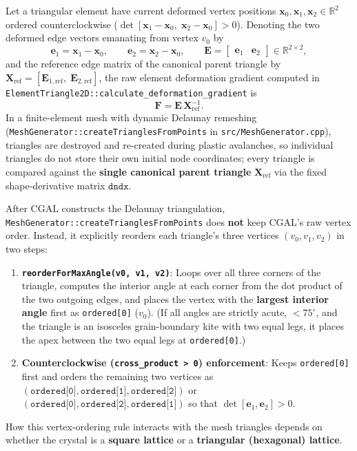 \documentclass[11pt,a4paper]{article}
\newcommand{\R}{\mathbb{R}}
\newcommand{\code}[1]{\texttt{#1}}
\begin{document}
Let a triangular element have current deformed vertex positions $\mathbf{x}_0, \mathbf{x}_1, \mathbf{x}_2 \in \R^2$ ordered counterclockwise ($\det[\mathbf{x}_1-\mathbf{x}_0,\;\mathbf{x}_2-\mathbf{x}_0] > 0$). Denoting the two deformed edge vectors emanating from vertex $v_0$ by
\begin{equation}
  \mathbf{e}_1 = \mathbf{x}_1 - \mathbf{x}_0, \qquad
  \mathbf{e}_2 = \mathbf{x}_2 - \mathbf{x}_0, \qquad
  \mathbf{E} = \begin{bmatrix} \mathbf{e}_1 & \mathbf{e}_2 \end{bmatrix} \in \R^{2\times 2},
\end{equation}
and the reference edge matrix of the canonical parent triangle by $\mathbf{X}_{\text{ref}} = [\mathbf{E}_{1,\text{ref}},\; \mathbf{E}_{2,\text{ref}}]$, the raw element deformation gradient computed in \code{ElementTriangle2D::calculate\_deformation\_gradient} is
\begin{equation}
  \mathbf{F} = \mathbf{E}\,\mathbf{X}_{\text{ref}}^{-1}.
  \label{eq:raw_F}
\end{equation}
In a finite-element mesh with dynamic Delaunay remeshing (\code{MeshGenerator::createTrianglesFromPoints} in \code{src/MeshGenerator.cpp}), triangles are destroyed and re-created during plastic avalanches, so individual triangles do not store their own initial node coordinates; every triangle is compared against the \textbf{single canonical parent triangle} $\mathbf{X}_{\text{ref}}$ via the fixed shape-derivative matrix $\texttt{dndx}$.

After CGAL constructs the Delaunay triangulation, \code{MeshGenerator::createTrianglesFromPoints} does \textbf{not} keep CGAL's raw vertex order. Instead, it explicitly reorders each triangle's three vertices $(v_0, v_1, v_2)$ in two steps:
\begin{enumerate}[noitemsep]
  \item \textbf{\code{reorderForMaxAngle(v0, v1, v2)}}: Loops over all three corners of the triangle, computes the interior angle at each corner from the dot product of the two outgoing edges, and places the vertex with the \textbf{largest interior angle} first as \code{ordered[0]} ($v_0$). (If all angles are strictly acute, $< 75^\circ$, and the triangle is an isosceles grain-boundary kite with two equal legs, it places the apex between the two equal legs at \code{ordered[0]}.)
  \item \textbf{Counterclockwise (\code{cross\_product > 0}) enforcement}: Keeps \code{ordered[0]} first and orders the remaining two vertices as $(\code{ordered[0]}, \code{ordered[1]}, \code{ordered[2]})$ or $(\code{ordered[0]}, \code{ordered[2]}, \code{ordered[1]})$ so that $\det[\mathbf{e}_1, \mathbf{e}_2] > 0$.
\end{enumerate}
How this vertex-ordering rule interacts with the mesh triangles depends on whether the crystal is a \textbf{square lattice} or a \textbf{triangular (hexagonal) lattice}.
\end{document}

